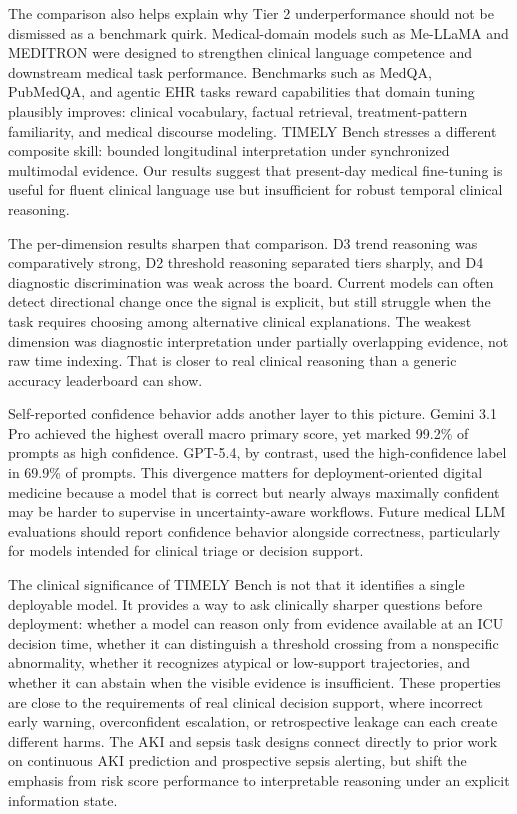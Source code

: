 \documentclass[pdflatex,sn-nature]{sn-jnl}
\begin{document}
The comparison also helps explain why Tier 2 underperformance should not be dismissed as a benchmark quirk. Medical-domain models such as Me-LLaMA and MEDITRON were designed to strengthen clinical language competence and downstream medical task performance\cite{xie2025mellama,chen2023meditron}. Benchmarks such as MedQA, PubMedQA, and agentic EHR tasks reward capabilities that domain tuning plausibly improves: clinical vocabulary, factual retrieval, treatment-pattern familiarity, and medical discourse modeling. TIMELY Bench stresses a different composite skill: bounded longitudinal interpretation under synchronized multimodal evidence. Our results suggest that present-day medical fine-tuning is useful for fluent clinical language use but insufficient for robust temporal clinical reasoning.

The per-dimension results sharpen that comparison. D3 trend reasoning was comparatively strong, D2 threshold reasoning separated tiers sharply, and D4 diagnostic discrimination was weak across the board. Current models can often detect directional change once the signal is explicit, but still struggle when the task requires choosing among alternative clinical explanations. The weakest dimension was diagnostic interpretation under partially overlapping evidence, not raw time indexing. That is closer to real clinical reasoning than a generic accuracy leaderboard can show.

Self-reported confidence behavior adds another layer to this picture. Gemini 3.1 Pro achieved the highest overall macro primary score, yet marked 99.2\% of prompts as high confidence. GPT-5.4, by contrast, used the high-confidence label in 69.9\% of prompts. This divergence matters for deployment-oriented digital medicine because a model that is correct but nearly always maximally confident may be harder to supervise in uncertainty-aware workflows. Future medical LLM evaluations should report confidence behavior alongside correctness, particularly for models intended for clinical triage or decision support.

The clinical significance of TIMELY Bench is not that it identifies a single deployable model. It provides a way to ask clinically sharper questions before deployment: whether a model can reason only from evidence available at an ICU decision time, whether it can distinguish a threshold crossing from a nonspecific abnormality, whether it recognizes atypical or low-support trajectories, and whether it can abstain when the visible evidence is insufficient. These properties are close to the requirements of real clinical decision support, where incorrect early warning, overconfident escalation, or retrospective leakage can each create different harms. The AKI and sepsis task designs connect directly to prior work on continuous AKI prediction and prospective sepsis alerting, but shift the emphasis from risk score performance to interpretable reasoning under an explicit information state\cite{tomasev2019aki,adams2022trews}.
\end{document}
